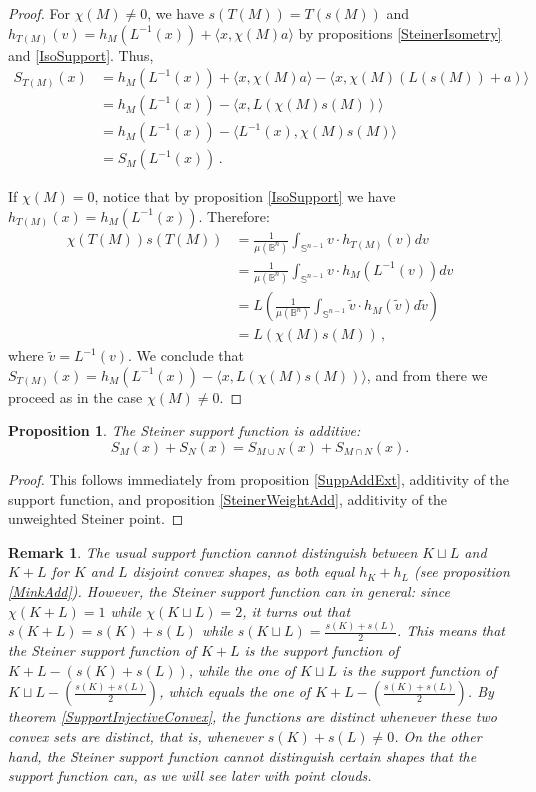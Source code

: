 \documentclass[a4paper]{article}
\newtheorem{prop}[theorem]{Proposition}
\newtheorem{remark}[theorem]{Remark}
\newcommand{\bb}{\mathbb}
\newcommand{\la}{\langle}
\newcommand{\ra}{\rangle}
\begin{document}
\begin{proof}
	For $\chi(M)\neq 0$, we have $s(T(M))=T(s(M))$ and $h_{T(M)}(v)=h_M(L^{-1}(x))+ \la x, \chi(M)a\ra$ by propositions \ref{SteinerIsometry} and \ref{IsoSupport}. Thus,
	\begin{align*} 
		S_{T(M)}(x)&=h_M(L^{-1}(x))+\la x,\chi(M)a\ra-\la x, \chi(M)(L(s(M))+a) \ra \\
		&= h_M(L^{-1}(x))-\la x, L(\chi(M)s(M)) \ra \\
		&= h_M(L^{-1}(x))-\la L^{-1}(x), \chi(M)s(M) \ra \\
		&=S_M(L^{-1}(x))\, .
	\end{align*}
	
	If $\chi(M)=0$, notice that by proposition \ref{IsoSupport} we have $h_{T(M)}(x)=h_{M}(L^{-1}(x))$. Therefore:
	\begin{align*} 
		\chi(T(M))s(T(M)) &= \frac{1}{\mu(\bb B^n)}\int_{\bb S^{n-1}} v \cdot h_{T(M)}(v) dv\\
		&=\frac{1}{\mu(\bb B^n)}\int_{\bb S^{n-1}} v \cdot h_M(L^{-1}(v)) dv\\ &= L\left(\frac{1}{\mu(\bb B^n)}\int_{\bb S^{n-1}} \tilde v \cdot h_M(\tilde v) d\tilde v\right) \\&= L(\chi(M)s(M))\, , \end{align*}
	where $\tilde v = L^{-1}(v)$. We conclude that $S_{T(M)}(x)=h_M(L^{-1}(x))-\la x, L(\chi(M)s(M)) \ra$, and from there
	we proceed as in the case $\chi(M)\neq0$.
\end{proof}
\begin{prop}
	\label{SteinerSuppAdd}
	The Steiner support function is additive:
	\[ S_M(x)+S_N(x)=S_{M \cup N}(x)+S_{M \cap N}(x). \]
\end{prop}

\begin{proof}
	This follows immediately from proposition \ref{SuppAddExt}, additivity of the support function, and proposition \ref{SteinerWeightAdd}, additivity of the unweighted Steiner point.
\end{proof}

\begin{remark}
	The usual support function cannot distinguish between $K \sqcup L$ and $K+L$ for $K$ and $L$ disjoint convex shapes, as both equal $h_K +h_L$ (see proposition \ref{MinkAdd}). However, the Steiner support function can in general: since $\chi(K + L)=1$ while $\chi(K \sqcup L)=2$, it turns out that $s(K+L)=s(K)+s(L)$ while $s(K \sqcup L)=\frac{s(K)+s(L)}{2}$. This means that the Steiner support function of $K+L$ is the support function of $K+L-(s(K)+s(L))$, while the one of $K \sqcup L$ is the support function of $K \sqcup L-\left( \frac{s(K)+s(L)}{2}\right)$, which equals the one of $K + L-\left( \frac{s(K)+s(L)}{2}\right)$. By theorem \ref{SupportInjectiveConvex}, the functions are distinct whenever these two convex sets are distinct, that is, whenever $s(K)+s(L) \neq 0$. On the other hand, the Steiner support function cannot distinguish certain shapes that the support function can, as we will see later with point clouds.
\end{remark}
\end{document}
